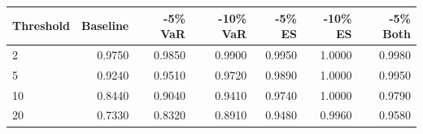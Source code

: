 \begin{tabular}{@{}lrrrrrr@{}}
\toprule
Threshold & Baseline & -5\% VaR & -10\% VaR & -5\% ES & -10\% ES & -5\% Both \\
\midrule
2 & 0.9750 & 0.9850 & 0.9900 & 0.9950 & 1.0000 & 0.9980 \\
5 & 0.9240 & 0.9510 & 0.9720 & 0.9890 & 1.0000 & 0.9950 \\
10 & 0.8440 & 0.9040 & 0.9410 & 0.9740 & 1.0000 & 0.9790 \\
20 & 0.7330 & 0.8320 & 0.8910 & 0.9480 & 0.9960 & 0.9580 \\
\bottomrule
\end{tabular}
